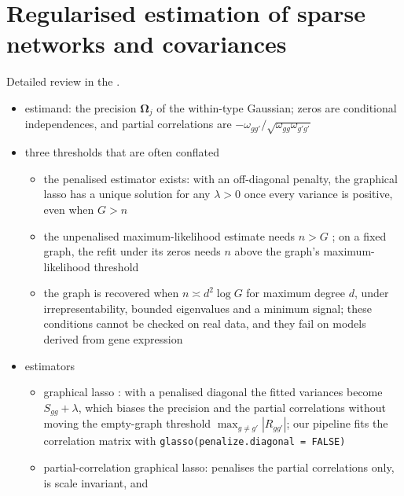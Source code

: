 \section{Regularised estimation of sparse networks and covariances}
\label{app:networks}

Detailed review in the .

\begin{itemize}
  \item estimand: the precision \(\boldsymbol{\Omega}_{j}\) of the within-type Gaussian; zeros are conditional
        independences, and partial correlations are \(-\omega_{gg'}/\sqrt{\omega_{gg}\omega_{g'g'}}\)
  \item three thresholds that are often conflated
  \begin{itemize}
    \item the penalised estimator exists: with an off-diagonal penalty, the graphical lasso has a unique solution
          for any \(\lambda>0\) once every variance is positive, even when \(G>n\)
          \cite{carterExistencePenalisedLikelihood2025}
    \item the unpenalised maximum-likelihood estimate needs \(n>G\)
          \cite{chiquetContributionsSparseMethods2015}; on a fixed graph, the refit under its zeros needs \(n\) above
          the graph's maximum-likelihood threshold \cite{dahlMaximumLikelihoodEstimation2005}
    \item the graph is recovered when \(n\asymp d^{2}\log G\) for maximum degree \(d\), under irrepresentability,
          bounded eigenvalues and a minimum signal; these conditions cannot be checked on real data, and they
          fail on models derived from gene expression
          \cite{chiquetContributionsSparseMethods2015,heinävaaraInconsistencyℓ1penalisedSparse2016}
  \end{itemize}
  \item estimators
  \begin{itemize}
    \item graphical lasso \cite{friedmanSparseInverseCovariance2008,mazumderGraphicalLassoNew2011}: with a penalised
          diagonal the fitted variances become \(S_{gg}+\lambda\), which biases the precision and the partial
          correlations without moving the empty-graph threshold \(\max_{g\neq g'}|R_{gg'}|\); our pipeline fits the
          correlation matrix with \texttt{glasso(penalize.diagonal = FALSE)}
    \item partial-correlation graphical lasso: penalises the partial correlations only, is scale invariant, and

\end{itemize}
\end{itemize}
